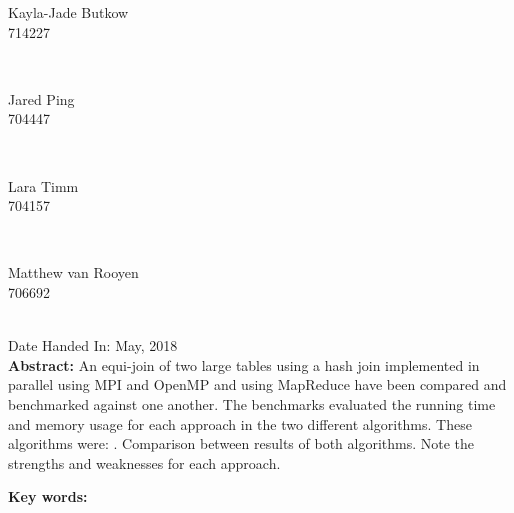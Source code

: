 \documentclass[10pt,twocolumn]{witseiepaper}
\begin{document}
\begin{titlepage}
		
		\begin{minipage}{0.4\textwidth}
			\begin{flushleft} \large
				Kayla-Jade Butkow \\ 714227 %
			\end{flushleft}
		\end{minipage}
		~
		\begin{minipage}{0.4\textwidth}
			\begin{flushright} \large
				Jared Ping \\ 704447
			\end{flushright}
		\end{minipage}\\[1cm]
		
		\begin{minipage}{0.4\textwidth}
			\begin{flushleft} \large
				Lara Timm \\ 704157
			\end{flushleft}
		\end{minipage}
		~
		\begin{minipage}{0.4\textwidth}
			\begin{flushright} \large
				Matthew van Rooyen \\ 706692
			\end{flushright}
		\end{minipage}\\[1cm]
		{\large Date Handed In:  May, 2018}\\[1cm] 
\vfill	
\justify
\textbf{Abstract: } An equi-join of two large tables using a hash join implemented in parallel using MPI and OpenMP and using MapReduce have been compared and benchmarked against one another. The benchmarks evaluated the running time and memory usage for each approach in the two different algorithms. These algorithms were: . Comparison between results of both algorithms. Note the strengths and weaknesses for each approach.
		
\textbf{Key words: }
		
	\end{titlepage}


\pagestyle{plain}
\setcounter{page}{1}
\twocolumn
%
\end{document}
